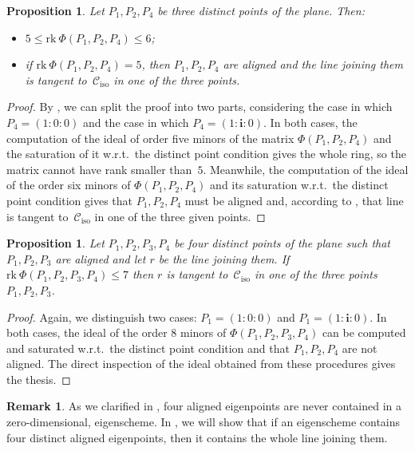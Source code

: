 \documentclass{amsart}
\theoremstyle{plain}
\newtheorem{prop}[lemma]{Proposition}
\theoremstyle{definition}
\newtheorem{rmk}[lemma]{Remark}
\newcommand{\iso}{\mathcal{C}_{\mathrm{iso}}}
\newcommand{\iii}{\textbf{i}}
\newcommand{\rk}{\ensuremath{\mathrm{rk}}}
\begin{document}
\begin{prop}
\label{manca il riferimento su ancillary    non e': condition_rank_aligned}
Let $P_1, P_2, P_4$ be three distinct points of the plane. Then:
%
\begin{itemize}
 \item $5 \leq \rk \ \Phi(P_1, P_2, P_4) \leq 6$;
 \item if
 $\rk \ \Phi(P_1, P_2, P_4) = 5$, then $P_1, P_2, P_4$
 are aligned and the line joining them is tangent to~$\iso$
 in one of the three points.
\end{itemize}
%
\end{prop}
\begin{proof}
By , we can split the proof into two parts, considering the case in
which $P_4 = (1: 0: 0)$ and the case in which $P_4 = (1: \iii: 0)$.
In both cases, the computation of the ideal of order five minors of the matrix
$\Phi(P_1, P_2, P_4)$ and the saturation of it w.r.t.\ the distinct point condition gives the whole ring, so the matrix cannot have rank smaller than~$5$.
Meanwhile, the computation
of the ideal of the order six minors of $\Phi(P_1, P_2, P_4)$ and its
saturation w.r.t.\ the distinct point condition gives that
$P_1, P_2, P_4$ must be aligned and, according to ,
that line is tangent to~$\iso$ in one of the three given points.
\end{proof}


\begin{prop}
\label{prop:condition3+1}
Let $P_1, P_2, P_3, P_4$ be four distinct points of the plane such that
$P_1, P_2, P_3$ are aligned and let $r$
be the line joining them. If
$\rk \ \Phi(P_1, P_2, P_3, P_4) \leq 7$ then $r$ is tangent to~$\iso$ in one of the three points $P_1, P_2, P_3$.
\end{prop}
\begin{proof}
Again, we distinguish two cases: $P_1 = (1: 0: 0)$ and
$P_1 = (1: \iii: 0)$. In both cases, the ideal of the order $8$
minors of $\Phi(P_1, P_2, P_3, P_4)$ can be computed and saturated
w.r.t.\ the distinct point condition and that
$P_1, P_2, P_4$ are not aligned.
The direct inspection of the ideal obtained from these procedures gives the thesis.
\end{proof}

\begin{rmk}
 As we clarified in , four aligned eigenpoints are never contained in a zero-dimensional, eigenscheme. In , we will show that if an eigenscheme contains four distinct aligned eigenpoints, then it contains the whole line joining them.
\end{rmk}
\end{document}
